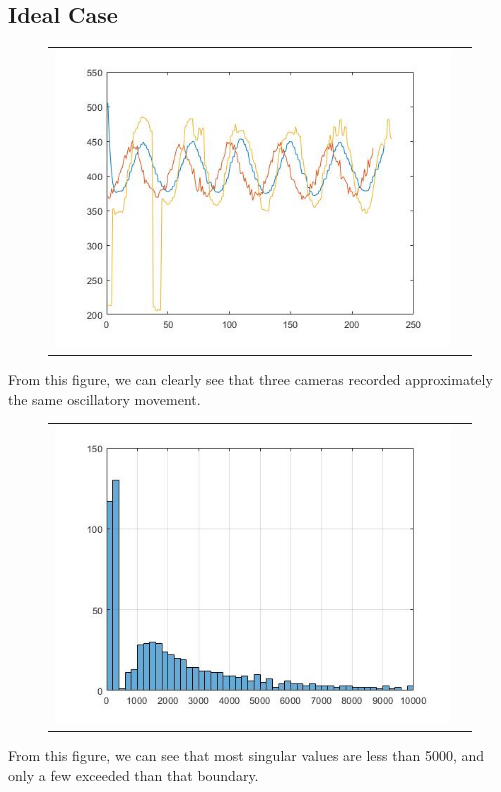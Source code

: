 \documentclass[12pt]{article}
\begin{document}
\subsection{Ideal Case}
\begin{figure}[H]
\begin{tabular}{cc}
  \includegraphics[width=\textwidth]{N_1.jpg}
\end{tabular}
\end{figure}
From this figure, we can clearly see that three cameras recorded approximately the same oscillatory movement.
\begin{figure}[H]
\begin{tabular}{cc}
  \includegraphics[width=\textwidth]{N_1_variance.jpg}
\end{tabular}
\end{figure}
From this figure, we can see that most singular values are less than 5000, and only a few exceeded than that boundary.
\end{document}

